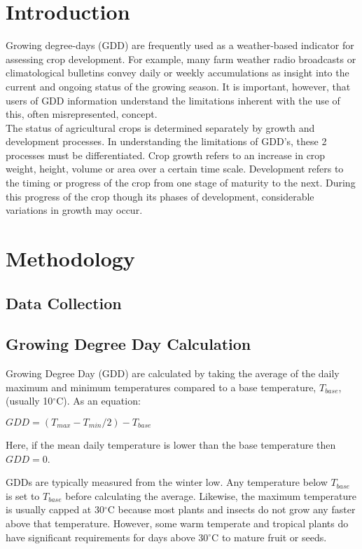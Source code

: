 \documentclass{article}
\begin{document}
\section{ \bf Introduction}
Growing degree-days (GDD) are frequently used as a weather-based indicator for assessing crop development. For example, many farm weather radio broadcasts or climatological bulletins convey daily or weekly accumulations as insight into the current and ongoing status of the growing season. It is important, however, that users of GDD information understand the limitations inherent with the use of this, often misrepresented, concept.\\ [\baselineskip] The status of agricultural crops is determined separately by growth and development processes. In understanding the limitations of GDD's, these 2 processes must be differentiated. Crop growth refers to an increase in crop weight, height, volume or area over a certain time scale. Development refers to the timing or progress of the crop from one stage of maturity to the next. During this progress of the crop though its phases of development, considerable variations in growth may occur. 

\section{ \bf Methodology}
\subsection{Data Collection}
\subsection{Growing Degree Day Calculation}
Growing Degree Day (GDD) are calculated by taking the average of the daily maximum and minimum temperatures compared to a base temperature, $T_{base}$, (usually 10$^{\circ}$C). As an equation: \vspace{5mm}

{\centering
$ GDD = (T_{max} - T_{min} /2) - T_{base} $\\ [\baselineskip]
}

Here, if the mean daily temperature is lower than the base temperature then $GDD = 0$.\vspace{5mm}

GDDs are typically measured from the winter low. Any temperature below $T_{base}$ is set to $T_{base}$ before calculating the average. Likewise, the maximum temperature is usually capped at 30$^{\circ}$C because most plants and insects do not grow any faster above that temperature. However, some warm temperate and tropical plants do have significant requirements for days above 30$^{\circ}$C to mature fruit or seeds.\vspace{5mm}
\end{document}

